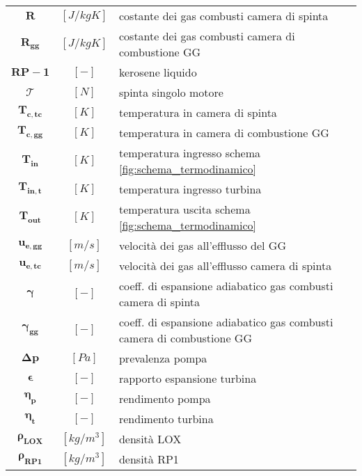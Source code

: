 \begin{multicols}{2}
{\begin{xltabular}{\linewidth}{cc>{\raggedright\arraybackslash}X}
		$\bm{R}$ & $[J/kgK]$ & costante dei gas combusti camera di spinta\\
		$\bm{R_{gg}}$ & $[J/kgK]$ & costante dei gas combusti camera di combustione GG\\
		$\bm{RP-1}$ & $[-]$ & kerosene liquido \\
		$\bm{\mathcal{T}}$ & $[N]$ & spinta singolo motore\\
		$\bm{T_{c,tc}}$ & $[K]$ & temperatura in camera di spinta\\
		$\bm{T_{c,gg}}$ & $[K]$ & temperatura in camera di combustione GG\\
		$\bm{T_{in}}$ & $[K]$ & temperatura ingresso schema \autoref{fig:schema_termodinamico}\\
		$\bm{T_{in,t}}$ & $[K]$ & temperatura ingresso turbina\\
		$\bm{T_{out}}$ & $[K]$ & temperatura uscita schema \autoref{fig:schema_termodinamico}\\
		$\bm{u_{e,gg}}$ & $[m/s]$ & velocità dei gas all'efflusso del GG \\
		$\bm{u_{e,tc}}$ & $[m/s]$ & velocità dei gas all'efflusso camera di spinta \\
		$\bm{\gamma}$ & $[-]$ & coeff. di espansione adiabatico gas combusti camera di spinta\\
		$\bm{\gamma_{gg}}$ & $[-]$ & coeff. di espansione adiabatico gas combusti camera di combustione GG\\
		$\bm{\Delta p}$ & $[Pa]$ & prevalenza pompa\\
		$\bm{\epsilon}$ & $[-]$ & rapporto espansione turbina\\
		$\bm{\eta_p}$ & $[-]$ & rendimento pompa\\
		$\bm{\eta_t}$ & $[-]$ & rendimento turbina\\
		$\bm{\rho_{LOX}}$ & $[kg/m^3]$ & densità LOX \\
		$\bm{\rho_{RP1}}$ & $[kg/m^3]$ & densità RP1
	\end{xltabular}
	\unskip
	\unpenalty
	\unpenalty}
	\unvbox\ltmcbox


\end{multicols}
